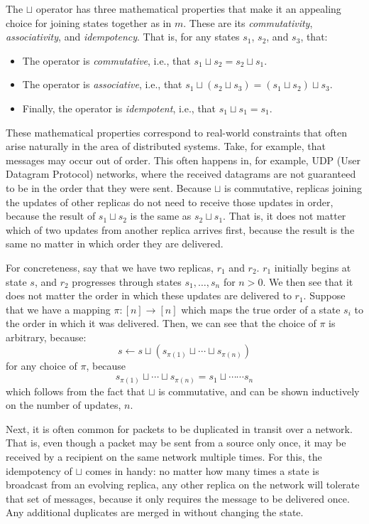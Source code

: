 The $\sqcup$ operator has three mathematical properties that make it an
appealing choice for joining states together as in $m$. These are its
\emph{commutativity}, \emph{associativity}, and \emph{idempotency}. That is, for
any states $s_1$, $s_2$, and $s_3$, that:
\begin{itemize}
  \item The operator is \emph{commutative}, i.e., that $s_1 \sqcup s_2 = s_2
    \sqcup s_1$.
  \item The operator is \emph{associative}, i.e., that $s_1 \sqcup (s_2 \sqcup
    s_3) = (s_1 \sqcup s_2) \sqcup s_3$.
  \item Finally, the operator is \emph{idempotent}, i.e., that $s_1 \sqcup s_1 =
    s_1$.
\end{itemize}

These mathematical properties correspond to real-world constraints that often
arise naturally in the area of distributed systems. Take, for example, that
messages may occur out of order. This often happens in, for example, UDP (User
Datagram Protocol) networks, where the received datagrams are not guaranteed to
be in the order that they were sent. Because $\sqcup$ is commutative, replicas
joining the updates of other replicas do not need to receive those updates in
order, because the result of $s_1 \sqcup s_2$ is the same as $s_2 \sqcup s_1$.
That is, it does not matter which of two updates from another replica arrives
first, because the result is the same no matter in which order they are
delivered.

For concreteness, say that we have two replicas, $r_1$ and $r_2$. $r_1$
initially begins at state $s$, and $r_2$ progresses through states $s_1, \ldots,
s_n$ for $n > 0$. We then see that it does not matter the order in which these
updates are delivered to $r_1$. Suppose that we have a mapping $\pi : [n] \to
[n]$ which maps the true order of a state $s_i$ to the order in which it was
delivered. Then, we can see that the choice of $\pi$ is arbitrary, because:
\[
  s \gets s \sqcup (s_{\pi(1)} \sqcup \cdots \sqcup s_{\pi(n)})
\]
for any choice of $\pi$, because
\[
  s_{\pi(1)} \sqcup \cdots \sqcup s_{\pi(n)} = s_1 \sqcup \cdots \cdots s_n
\]
which follows from the fact that $\sqcup$ is commutative, and can be shown
inductively on the number of updates, $n$.

Next, it is often common for packets to be duplicated in transit over a network.
That is, even though a packet may be sent from a source only once, it may be
received by a recipient on the same network multiple times. For this, the
idempotency of $\sqcup$ comes in handy: no matter how many times a state is
broadcast from an evolving replica, any other replica on the network will
tolerate that set of messages, because it only requires the message to be
delivered once. Any additional duplicates are merged in without changing the
state.

